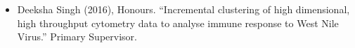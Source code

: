 \documentclass[a4paper]{article}
\begin{document}
\begin{itemize}





\item Deeksha Singh (2016), Honours. ``Incremental clustering of high dimensional, high throughput cytometry data to analyse immune response to West Nile Virus.'' Primary Supervisor.






\end{itemize}
\end{document}
